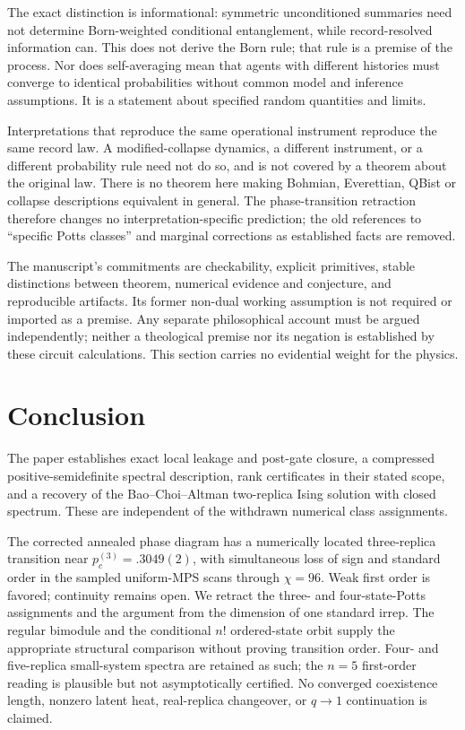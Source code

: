The exact distinction is informational: symmetric unconditioned summaries need not determine Born-weighted conditional entanglement, while record-resolved information can. This does not derive the Born rule; that rule is a premise of the process. Nor does self-averaging mean that agents with different histories must converge to identical probabilities without common model and inference assumptions. It is a statement about specified random quantities and limits.

Interpretations that reproduce the same operational instrument reproduce the same record law. A modified-collapse dynamics, a different instrument, or a different probability rule need not do so, and is not covered by a theorem about the original law. There is no theorem here making Bohmian, Everettian, QBist or collapse descriptions equivalent in general. The phase-transition retraction therefore changes no interpretation-specific prediction; the old references to ``specific Potts classes'' and marginal corrections as established facts are removed.

The manuscript's commitments are checkability, explicit primitives, stable distinctions between theorem, numerical evidence and conjecture, and reproducible artifacts. Its former non-dual working assumption is not required or imported as a premise. Any separate philosophical account must be argued independently; neither a theological premise nor its negation is established by these circuit calculations. This section carries no evidential weight for the physics.

\section{Conclusion}
\label{sec:conclusion}

The paper establishes exact local leakage and post-gate closure, a compressed positive-semidefinite spectral description, rank certificates in their stated scope, and a recovery of the Bao--Choi--Altman two-replica Ising solution with closed spectrum. These are independent of the withdrawn numerical class assignments.

The corrected annealed phase diagram has a numerically located three-replica transition near $p_c^{(3)}=.3049(2)$, with simultaneous loss of sign and standard order in the sampled uniform-MPS scans through $\chi=96$. Weak first order is favored; continuity remains open. We retract the three- and four-state-Potts assignments and the argument from the dimension of one standard irrep. The regular bimodule and the conditional $n!$ ordered-state orbit supply the appropriate structural comparison without proving transition order. Four- and five-replica small-system spectra are retained as such; the $n=5$ first-order reading is plausible but not asymptotically certified. No converged coexistence length, nonzero latent heat, real-replica changeover, or $q\to1$ continuation is claimed.

